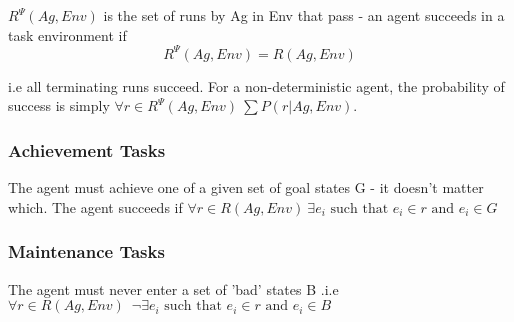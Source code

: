 $R^\Psi (Ag,Env)$ is the set of runs by Ag in Env that pass - an agent succeeds in a task environment if 
\[R^\Psi (Ag,Env) = R(Ag,Env) \]

i.e all terminating runs succeed.
For a non-deterministic agent, the probability of success is simply $ \forall r \in R^\Psi (Ag,Env) \: \sum P(r|Ag,Env) $.  

\subsubsection{Achievement Tasks}
The agent must achieve one of a given set of goal states G - it doesn't matter which. The agent succeeds if $\forall r \in R(Ag,Env) \: \exists e_i \text{ such that } e_i \in r \text{ and } e_i \in G$

\subsubsection{Maintenance Tasks}
The agent must never enter a set of 'bad' states B .i.e $\forall r \in R(Ag,Env) \enspace \neg\exists e_i \text{ such that } e_i \in r \text{ and } e_i \in B$